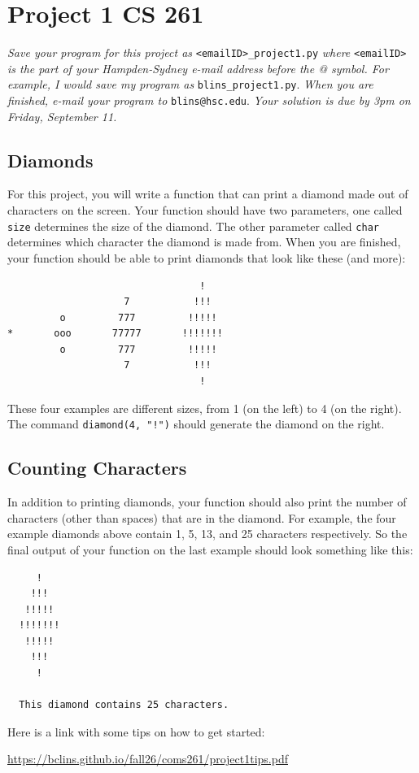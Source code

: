 \documentclass[12pt]{article}
\begin{document}
\section*{Project 1 \hfill CS 261}

\textit{Save your program for this project as} \verb|<emailID>_project1.py| \textit{where} \verb|<emailID>| \textit{is the part of your Hampden-Sydney e-mail address before the @ symbol.  For example, I would save my program as} \verb|blins_project1.py|. \textit{When you are finished, e-mail your program to} \verb|blins@hsc.edu|. \textit{Your solution is due by 3pm on Friday, September 11. }

\subsection*{Diamonds}

For this project, you will write a function that can print a diamond made out of characters on the screen.  Your function should have two parameters, one called \verb|size| determines the size of the diamond.  The other parameter called \verb|char| determines which character the diamond is made from.  When you are finished, your function should be able to print diamonds that look like these (and more):
\begin{center}
\begin{BVerbatim}
                                 !  
                    7           !!!
         o         777         !!!!!
*       ooo       77777       !!!!!!!
         o         777         !!!!!
                    7           !!!
                                 ! 
\end{BVerbatim}
\end{center}

\noindent 
These four examples are different sizes, from 1 (on the left) to 4 (on the right).  The command \verb|diamond(4, "!")| should generate the diamond on the right.

\subsection*{Counting Characters}

In addition to printing diamonds, your function should also print the number of characters (other than spaces) that are in the diamond.  For example, the four example diamonds above contain 1, 5, 13, and 25 characters respectively.  So the final output of your function on the last example should look something like this: \\

\noindent
\begin{BVerbatim}
     !  
    !!!
   !!!!!
  !!!!!!!
   !!!!!
    !!!
     ! 

  This diamond contains 25 characters. 

\end{BVerbatim}

\noindent
Here is a link with some tips on how to get started: 
\begin{center}
\url{https://bclins.github.io/fall26/coms261/project1tips.pdf}
\end{center}
\end{document}
